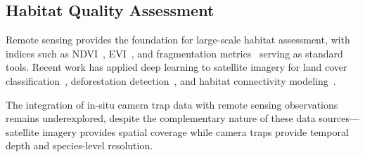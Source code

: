 \subsection{Habitat Quality Assessment}

Remote sensing provides the foundation for large-scale habitat assessment, with indices such as NDVI~\cite{tucker1979}, EVI~\cite{huete2002}, and fragmentation metrics~\cite{mcgarigal2012} serving as standard tools. Recent work has applied deep learning to satellite imagery for land cover classification~\cite{helber2019}, deforestation detection~\cite{ortega2021}, and habitat connectivity modeling~\cite{mcrae2008}.

The integration of in-situ camera trap data with remote sensing observations remains underexplored, despite the complementary nature of these data sources---satellite imagery provides spatial coverage while camera traps provide temporal depth and species-level resolution.

